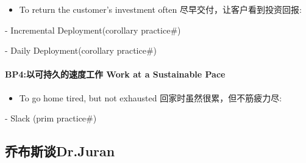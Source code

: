 \documentclass{book}        %
\providecommand{\tightlist}{%
  \setlength{\itemsep}{0pt}\setlength{\parskip}{0pt}}
\let\oldparagraph\paragraph
\renewcommand{\paragraph}[1]{\oldparagraph{#1}\mbox{}}
\begin{document}
\begin{itemize}
\tightlist
\item
  To return the customer's investment often
  尽早交付，让客户看到投资回报:
\end{itemize}

\begin{description}
\tightlist
\item[]
- Incremental Deployment(corollary practice\#)

- Daily Deployment(corollary practice\#)
\end{description}

\hypertarget{bp4ux4ee5ux53efux6301ux4e45ux7684ux901fux5ea6ux5de5ux4f5c-work-at-a-sustainable-pace}{%
\paragraph{BP4:以可持久的速度工作 Work at a Sustainable
Pace}\label{bp4ux4ee5ux53efux6301ux4e45ux7684ux901fux5ea6ux5de5ux4f5c-work-at-a-sustainable-pace}}

\begin{itemize}
\tightlist
\item
  To go home tired, but not exhausted 回家时虽然很累，但不筋疲力尽:\\
\end{itemize}

\begin{description}
\tightlist
\item[]
- Slack (prim practice\#)
\end{description}

\hypertarget{ux4e54ux5e03ux65afux8c08dr.juran}{%
\subsection{乔布斯谈Dr.Juran}\label{ux4e54ux5e03ux65afux8c08dr.juran}}
\end{document}

